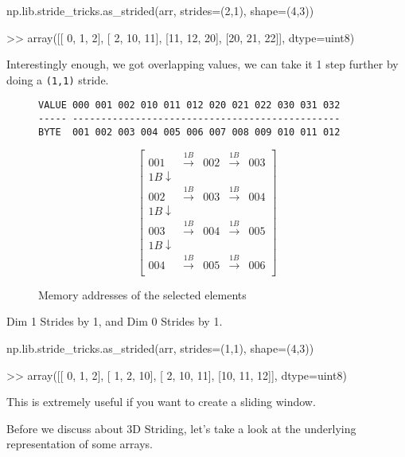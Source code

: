 \documentclass[oneside, 12pt]{report}
\begin{document}
\begin{python}
np.lib.stride_tricks.as_strided(arr, strides=(2,1), shape=(4,3))

>> array([[ 0,  1,  2],
          [ 2, 10, 11],
          [11, 12, 20],
          [20, 21, 22]], dtype=uint8)
\end{python}

Interestingly enough, we got overlapping values, we can take it 1 step further by doing a \verb+(1,1)+ stride.

\begin{figure}[H]
\begin{verbatim}
VALUE 000 001 002 010 011 012 020 021 022 030 031 032
----- -----------------------------------------------
BYTE  001 002 003 004 005 006 007 008 009 010 011 012
\end{verbatim}
\end{figure}

\begin{figure}[H]
\begin{equation*}
\begin{bmatrix}
001 & \xrightarrow{1B} & 002 &\xrightarrow{1B} & 003 \\
1B \downarrow \\
002 & \xrightarrow{1B} & 003 &\xrightarrow{1B} & 004 \\
1B \downarrow \\
003 & \xrightarrow{1B} & 004 &\xrightarrow{1B} & 005 \\
1B \downarrow \\
004 & \xrightarrow{1B} & 005 &\xrightarrow{1B} & 006 \\
\end{bmatrix}
\end{equation*}
\caption{Memory addresses of the selected elements}
\end{figure}

\begin{shaded}
Dim 1 Strides by 1, and Dim 0 Strides by 1.
\end{shaded}

\begin{python}
np.lib.stride_tricks.as_strided(arr, strides=(1,1), shape=(4,3))

>> array([[ 0,  1,  2],
          [ 1,  2, 10],
          [ 2, 10, 11],
          [10, 11, 12]], dtype=uint8)
\end{python}

This is extremely useful if you want to create a sliding window.

Before we discuss about 3D Striding, let's take a look at the underlying representation of some arrays.
\end{document}
